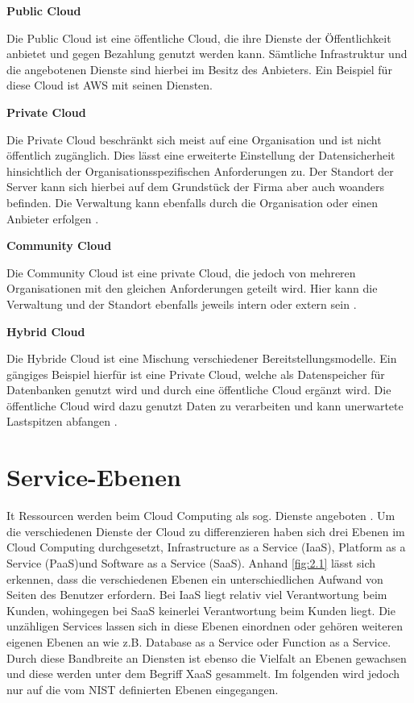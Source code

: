 \textbf{Public Cloud}

Die Public Cloud ist eine öffentliche Cloud, die ihre Dienste der Öffentlichkeit anbietet und gegen Bezahlung genutzt werden kann. Sämtliche Infrastruktur und die angebotenen Dienste sind hierbei im Besitz des Anbieters. Ein Beispiel für diese Cloud ist AWS mit seinen Diensten\cite*[]{Wirtz2022}.

\textbf{Private Cloud}

Die Private Cloud beschränkt sich meist auf eine Organisation und ist nicht öffentlich zugänglich. Dies lässt eine erweiterte Einstellung der Datensicherheit hinsichtlich der Organisationsspezifischen Anforderungen zu\cite*[]{Wirtz2022}. Der Standort der Server kann sich hierbei auf dem Grundstück der Firma aber auch woanders befinden. Die Verwaltung kann ebenfalls durch die Organisation oder einen Anbieter erfolgen \cite*[]{DAAS}.

\textbf{Community Cloud}

Die Community Cloud ist eine private Cloud, die jedoch von mehreren Organisationen mit den gleichen Anforderungen geteilt wird. Hier kann die Verwaltung und der Standort ebenfalls jeweils intern oder extern sein \cite*[]{DAAS}.

\textbf{Hybrid Cloud}

Die Hybride Cloud ist eine Mischung verschiedener Bereitstellungsmodelle. Ein gängiges Beispiel hierfür ist eine Private Cloud, welche als Datenspeicher für Datenbanken genutzt wird und durch eine öffentliche Cloud ergänzt wird. Die öffentliche Cloud wird dazu genutzt Daten zu verarbeiten und kann unerwartete Lastspitzen abfangen \cite*[]{DAAS}.

\section{Service-Ebenen}
It Ressourcen werden beim Cloud Computing als sog. Dienste angeboten \cite*[]{Zarnekow}. Um die verschiedenen Dienste der Cloud zu differenzieren haben sich drei Ebenen im Cloud Computing durchgesetzt, Infrastructure as a Service (IaaS), Platform as a Service (PaaS)und Software as a Service (SaaS). Anhand \autoref{fig:2.1} lässt sich erkennen, dass die verschiedenen Ebenen ein unterschiedlichen Aufwand von Seiten des Benutzer erfordern. Bei IaaS liegt relativ viel Verantwortung beim Kunden, wohingegen bei SaaS keinerlei Verantwortung beim Kunden liegt. Die unzähligen Services lassen sich in diese Ebenen einordnen oder gehören weiteren eigenen Ebenen an wie z.B. Database as a Service oder Function as a Service. Durch diese Bandbreite an Diensten ist ebenso die Vielfalt an Ebenen gewachsen und diese werden unter dem Begriff XaaS gesammelt. Im folgenden wird jedoch nur auf die vom NIST definierten Ebenen eingegangen.

